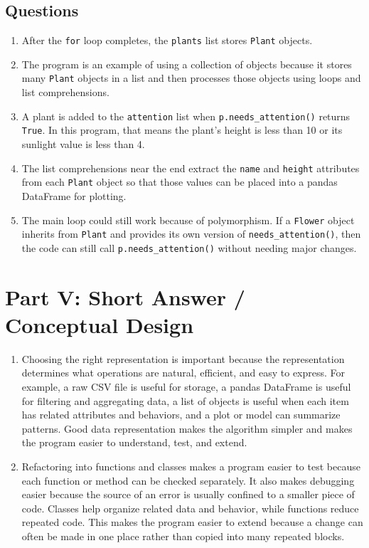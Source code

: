 \documentclass[12pt]{article}
\begin{document}
\subsection*{Questions}

\begin{enumerate}[label=\arabic*.]
\item After the \texttt{for} loop completes, the \texttt{plants} list stores \texttt{Plant} objects.

\item The program is an example of using a collection of objects because it stores many \texttt{Plant} objects in a list and then processes those objects using loops and list comprehensions.

\item A plant is added to the \texttt{attention} list when \texttt{p.needs\_attention()} returns \texttt{True}. In this program, that means the plant's height is less than 10 or its sunlight value is less than 4.

\item The list comprehensions near the end extract the \texttt{name} and \texttt{height} attributes from each \texttt{Plant} object so that those values can be placed into a pandas DataFrame for plotting.

\item The main loop could still work because of polymorphism. If a \texttt{Flower} object inherits from \texttt{Plant} and provides its own version of \texttt{needs\_attention()}, then the code can still call \texttt{p.needs\_attention()} without needing major changes.
\end{enumerate}

\section*{Part V: Short Answer / Conceptual Design}

\begin{enumerate}[label=\arabic*.]
\item Choosing the right representation is important because the representation determines what operations are natural, efficient, and easy to express. For example, a raw CSV file is useful for storage, a pandas DataFrame is useful for filtering and aggregating data, a list of objects is useful when each item has related attributes and behaviors, and a plot or model can summarize patterns. Good data representation makes the algorithm simpler and makes the program easier to understand, test, and extend.

\item Refactoring into functions and classes makes a program easier to test because each function or method can be checked separately. It also makes debugging easier because the source of an error is usually confined to a smaller piece of code. Classes help organize related data and behavior, while functions reduce repeated code. This makes the program easier to extend because a change can often be made in one place rather than copied into many repeated blocks.
\end{enumerate}
\end{document}
